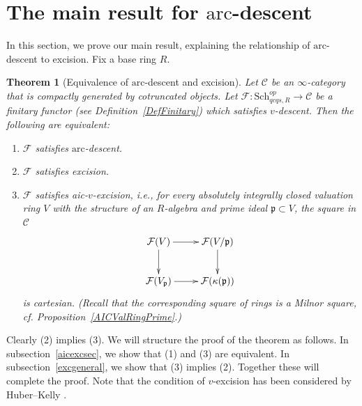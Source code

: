 \documentclass[reqno]{amsart}
\newcommand{\arc}{\mathrm{arc}}
\newtheorem{theorem}{Theorem}[section]
\theoremstyle{definition}
\begin{document}
\newpage
\section{The main result for $\arc$-descent}

In this section, we prove our main result, explaining the relationship of
$\arc$-descent to excision. Fix a base ring $R$.
\begin{theorem}[Equivalence of $\arc$-descent and excision]
\label{mainthm}
Let $\mathcal{C}$ be an $\infty$-category that is compactly generated by cotruncated objects. 
Let $\mathcal{F}\colon  \mathrm{Sch}_{qcqs,R}^{op} \to \mathcal{C}$ be a finitary functor (see Definition~\ref{DefFinitary}) which satisfies $v$-descent. Then the following are equivalent: 
\begin{enumerate}
\item $\mathcal{F}$ satisfies $\arc$-descent. 
\item $\mathcal{F}$ satisfies excision. 
\item $\mathcal{F}$ satisfies {\em aic-$v$-excision}, i.e., for every
absolutely integrally closed valuation ring $V$ with the structure of an $R$-algebra  and prime ideal
$\mathfrak{p} \subset V$, the square
in $\mathcal{C}$
\begin{equation} \label{faic}  \begin{aligned}\xymatrix{
\mathcal{F}(V) \ar[d]  \ar[r] &  \mathcal{F}( V/\mathfrak{p}) \ar[d]  \\
\mathcal{F}(V_{\mathfrak{p}}) \ar[r] &  \mathcal{F}(\kappa(\mathfrak{p}))
} \end{aligned} \end{equation}
is  cartesian.  (Recall that the corresponding square of rings is a Milnor square, cf. Proposition~\ref{AICValRingPrime}.)
\end{enumerate}
\end{theorem} 

Clearly (2) implies (3). We will structure the proof of the theorem as follows. In subsection~\ref{aicexcsec}, we show that (1) and (3) are equivalent. In subsection~\ref{excgeneral}, we show that (3) implies (2). Together these will complete the proof. 
Note that the condition of $v$-excision has been considered by Huber--Kelly
\cite{HK18}. 
\end{document}
